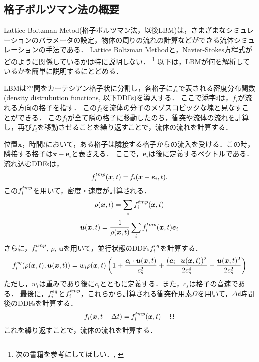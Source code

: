 \subsection{格子ボルツマン法の概要}
Lattice Boltzman Metod(格子ボルツマン法，以後LBM)は，さまざまなシミュレーションのパラメータの設定，物体の周りの流れの計算などができる流体シミュレーションの手法である．
Lattice Boltzman Methodと，Navier-Stokes方程式がどのように関係しているかは特に説明しない．
\footnote{
    次の書籍を参考にしてほしい．\cite{ref:kruger2017lattice}, \cite{ref:chapman1990mathematical}
}
以下は，LBMが何を解析しているかを簡単に説明するにとどめる\cite{ref:lbm}．

LBMは空間をカーテシアン格子状に分割し，各格子に$f_i$で表される密度分布関数(density distrubution functions, 以下DDFs)を導入する．
ここで添字$i$は，$f_i$が流れる方向の格子を指す．
この$f_i$を流体の分子のメゾスコピックな塊と見なすことができる．
この$f_i$が全て隣の格子に移動したのち，衝突や流体の流れを計算し，再び$f_i$を移動させることを繰り返すことで，流体の流れを計算する．

位置$\bm{x}$，時間$t$において，ある格子は隣接する格子からの流入を受ける．この時，隣接する格子は$\bm{x}-\bm{e}_i$と表さえる．
ここで，$\bm{e}_i$は後に定義するベクトルである．
流れ込むDDFsは，
\begin{equation}\label{eq:streaming}
    f^{tmp}_{i}(\bm{x}, t)=f_{i}(\bm{x}-\bm{e}_i, t).
\end{equation}
この$f^{tmp}_{i}$を用いて，密度・速度が計算される．
\begin{equation}\label{eq:rho}
    \rho(\bm{x}, t)=\sum_{i} f^{tmp}_{i}(\bm{x}, t)
\end{equation}
\begin{equation}\label{eq:velocity}
    \bm{u}(\bm{x}, t)=\frac{1}{\rho(\bm{x}, t)} \sum_{i} f^{tmp}_{i}(\bm{x}, t) \bm{e}_{i}
\end{equation}
さらに，$f^{tmp}_{i}$, $\rho$, $\bm{u}$を用いて，並行状態のDDFs$f^{eq}_{i}$を計算する．
\begin{equation}\label{eq:equil-ddf}
    f^{eq}_{i}(\rho(\bm{x}, t), \bm{u}(\bm{x}, t)) = w_i \rho(\bm{x}, t) \left(1 + \frac{\bm{e}_i \cdot \bm{u}(\bm{x}, t)}{c_s^2} + \frac{(\bm{e}_i \cdot \bm{u}(\bm{x}, t))^2}{2c_s^4} - \frac{\bm{u}(\bm{x}, t)^2}{2c_s^2} \right)
\end{equation}
ただし，$w_i$は重みであり後に$c_i$とともに定義する．また，$c_s$は格子の音速である．
最後に，$f^{eq}_{i}$と$f^{tmp}_{i}$，これらから計算される衝突作用素$\Omega$を用いて，$\Delta t$時間後のDDFsを計算する．
\begin{equation}\label{eq:next-ddf}
    f_i(\bm{x}, t+\Delta t) = f^{tmp}_{i}(\bm{x}, t) - \Omega
\end{equation}
これを繰り返すことで，流体の流れを計算する．

